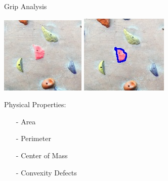 \documentclass{beamer}
\begin{document}
\begin{frame}[t]{Grip Analysis}
\begin{center}
\includegraphics[width=.45\linewidth]{img/close_up.jpg}  \hspace{.05cm}
\includegraphics[width=.455\linewidth]{img/close_up_c.jpg}
\end{center}
\pause
Physical Properties:\vspace{-.15cm}
\begin{multicols}{2}
\begin{itemize}
 \item[-] Area
 \item[-] Perimeter
 \item[-] Center of Mass
 \item[-] Convexity Defects
\end{itemize}

\end{multicols}
\end{frame}
\end{document}
